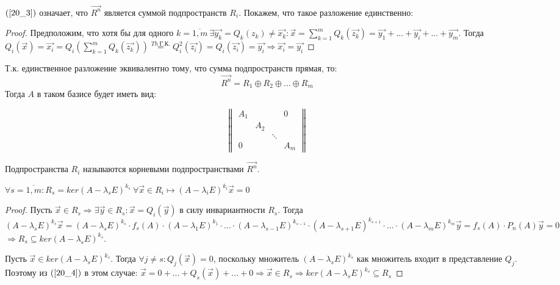 \documentclass[a4paper, 12pt]{article}
\begin{document}
$(\ref{20_3})$ означает, что $\vec{R^n}$ является суммой подпространств $R_i$. Покажем, что такое разложение единственно:
\begin{proof}
Предположим, что хотя бы для одного $k = \overline{1,m}~ \exists \vec{y_k} = Q_k(z_k) \neq \vec{x_k} : \vec{x} = \sum\limits_{k=1}^m{Q_k(\vec{z_k})} = \vec{y_1} + ... + \vec{y_i} + ... + \vec{y_m}$. Тогда $Q_i(\vec{x}) = \vec{x_i} = Q_i \left(\sum\limits_{k=1}^m{Q_k(\vec{z_k})}\right) \stackrel{Th~ \text{Г.К.}}{=} Q_i^2(\vec{z_i}) = Q_i(\vec{z_i}) = \vec{y_i} \Rightarrow \vec{x_i} = \vec{y_i}$
\end{proof}

Т.к. единственное разложение эквивалентно тому, что сумма подпространств прямая, то:
\[\vec{R^n} = R_1 \oplus R_2 \oplus ... \oplus R_m\]
Тогда $A$ в таком базисе будет иметь вид:

\begin{equation*}
\begin{Vmatrix}
  A_1 &     &        & 0   \\
      & A_2 &        &     \\
      &     & \ddots &     \\
  0   &     &        & A_m
\end{Vmatrix}
\end{equation*}

Подпространства $R_i$ называются корневыми подпространствами $\vec{R^n}$.

\begin{theorem}
$\forall s = \overline{1,m} : R_s = ker(A - \lambda_s E)^{k_s}~ \forall \vec{x} \in R_i \longmapsto (A - \lambda_i E)^{k_i} \vec{x} = 0$
\begin{proof}
Пусть $\vec{x} \in R_s \Rightarrow \exists \vec{y} \in R_s : \vec{x} = Q_i(\vec{y})$ в силу инвариантности $R_s$. Тогда $(A - \lambda_s E)^{k_s} \vec{x} = (A - \lambda_s E)^{k_s} \cdot f_s(A) \cdot (A - \lambda_1 E)^{k_1} \cdot ... \cdot (A - \lambda_{s-1} E)^{k_{s-1}} \cdot (A - \lambda_{s+1} E)^{k_{s+1}} \cdot ... \cdot (A - \lambda_m E)^{k_m} \vec{y} = f_s(A) \cdot P_n(A)\vec{y} = 0$
$ \Rightarrow R_s \subseteq ker(A - \lambda_s E) ^ {k_s}$.

Пусть $\vec{x} \in ker(A - \lambda_s E)^{k_s}$. Тогда $\forall j \neq s: Q_j(\vec{x}) = 0$, поскольку множитель $(A - \lambda_s E)^{k_s}$ как множитель входит в представление $Q_j$. Поэтому из $(\ref{20_4})$ в этом случае: $\vec{x} = 0 + ... + Q_s(\vec{x}) + ... + 0 \Rightarrow \vec{x} \in R_s \Rightarrow ker(A-\lambda_s E)^{k_s} \subseteq R_s$
\end{proof}
\end{theorem}
\end{document}
